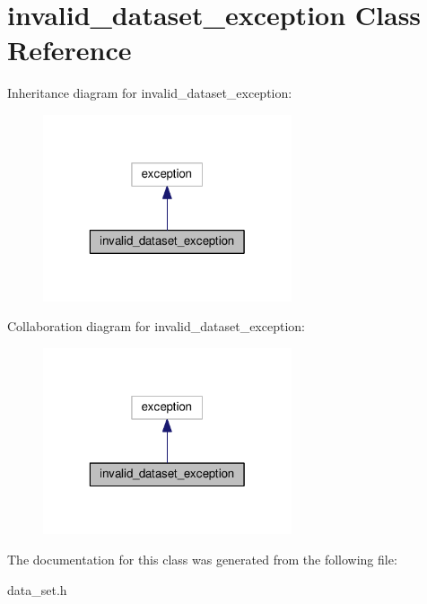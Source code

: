 \hypertarget{classinvalid__dataset__exception}{\section{invalid\-\_\-dataset\-\_\-exception Class Reference}
\label{classinvalid__dataset__exception}
}


Inheritance diagram for invalid\-\_\-dataset\-\_\-exception\-:
\nopagebreak
\begin{figure}[H]
\begin{center}
\leavevmode
\includegraphics[width=208pt]{classinvalid__dataset__exception__inherit__graph}
\end{center}
\end{figure}


Collaboration diagram for invalid\-\_\-dataset\-\_\-exception\-:
\nopagebreak
\begin{figure}[H]
\begin{center}
\leavevmode
\includegraphics[width=208pt]{classinvalid__dataset__exception__coll__graph}
\end{center}
\end{figure}


The documentation for this class was generated from the following file\-:\begin{DoxyCompactItemize}
\item 
data\-\_\-set.\-h\end{DoxyCompactItemize}
